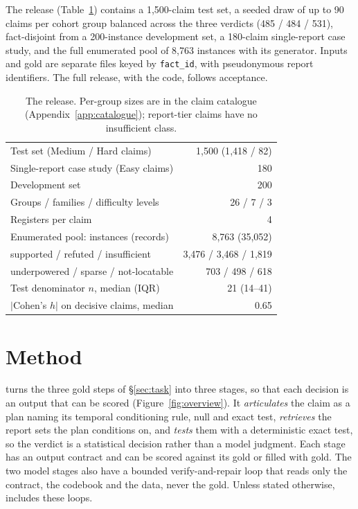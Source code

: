 \label{sec:release}\label{sec:stats}
The release (Table~\ref{tab:stats}) contains a 1{,}500-claim test set, a
seeded draw of up to 90 claims per cohort group balanced across the three
verdicts (485 / 484 / 531), fact-disjoint from a 200-instance development set, a 180-claim single-report
case study, and the full enumerated pool of 8{,}763 instances with its
generator. Inputs and gold are separate files keyed by \texttt{fact\_id}, with
pseudonymous report identifiers. The full release, with the code, follows
acceptance.

\begin{table}[t]
\centering
\small
\setlength{\tabcolsep}{4pt}
\begin{tabular}{@{}lr@{}}
\toprule
Test set (Medium / Hard claims) & 1{,}500 (1{,}418 / 82) \\
Single-report case study (Easy claims) & 180 \\
Development set & 200 \\
Groups / families / difficulty levels & 26 / 7 / 3 \\
Registers per claim & 4 \\
Enumerated pool: instances (records) & 8{,}763 (35{,}052) \\
\quad supported / refuted / insufficient & 3{,}476 / 3{,}468 / 1{,}819 \\
\quad underpowered / sparse / not-locatable & 703 / 498 / 618 \\
Test denominator $n$, median (IQR) & 21 (14--41) \\
$|$Cohen's $h|$ on decisive claims, median & 0.65 \\
\bottomrule
\end{tabular}
\caption{The release. Per-group sizes are in the claim catalogue
(Appendix~\ref{app:catalogue}); report-tier claims have no insufficient
class.}
\label{tab:stats}
\end{table}

\section{Method}
\label{sec:framework}
\label{sec:method}
\label{sec:contracts}
\label{sec:verify}

\art{} turns the three gold steps of \S\ref{sec:task} into three stages,
so that each decision is an output that can be scored
(Figure~\ref{fig:overview}). It \emph{articulates} the claim as a plan
naming its temporal conditioning rule, null and exact test,
\emph{retrieves} the report sets the plan conditions on, and \emph{tests}
them with a deterministic exact test, so the verdict is a statistical
decision rather than a model judgment. Each stage has an output contract and
can be scored against its gold or filled with gold. The two model stages
also have a bounded verify-and-repair loop that reads only the contract, the
codebook and the data, never the gold. Unless stated otherwise, \art{}
includes these loops.

